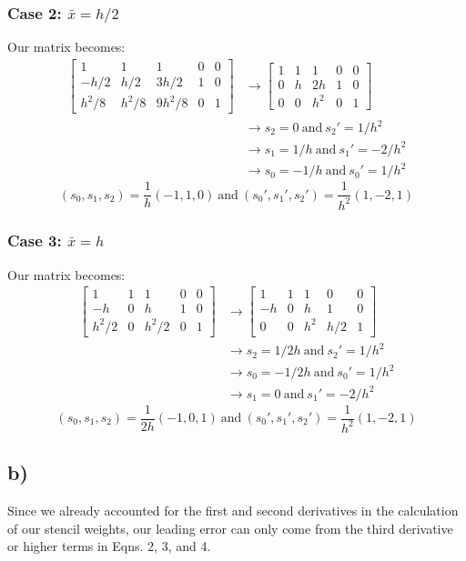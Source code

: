 \documentclass{article}
\newcommand{\andSp}{\ \mathrm{and}\ }
\begin{document}
\subsubsection*{Case 2: $\bar x=h/2$}
Our matrix becomes:
\begin{align*}
\begin{bmatrix}
1 & 1 & 1 & 0 & 0\\
-h/2 & h/2 & 3h/2 & 1 & 0\\
h^2/8 & h^2/8 & 9h^2/8 & 0 & 1
\end{bmatrix}
&\to\begin{bmatrix}
1 & 1 & 1 & 0 & 0\\
0 & h & 2h & 1 & 0\\
0 & 0 & h^2 & 0 & 1
\end{bmatrix} \\
&\to s_2=0\andSp s_2'=1/h^2 \\
&\to s_1=1/h\andSp s_1'=-2/h^2 \\
&\to s_0=-1/h\andSp s_0'=1/h^2
\end{align*}
\begin{equation}
\boxed{(s_0,s_1,s_2)=\frac{1}{h}(-1,1,0)\andSp(s_0',s_1',s_2')=\frac{1}{h^2}(1,-2,1)}
\end{equation}
\subsubsection*{Case 3: $\bar x=h$}
Our matrix becomes:
\begin{align*}
\begin{bmatrix}
1 & 1 & 1 & 0 & 0\\
-h & 0 & h & 1 & 0\\
h^2/2 & 0 & h^2/2 & 0 & 1
\end{bmatrix}
&\to
\begin{bmatrix}
1 & 1 & 1 & 0 & 0\\
-h & 0 & h & 1 & 0\\
0 & 0 & h^2 & h/2 & 1
\end{bmatrix} \\
&\to s_2=1/2h\andSp s_2'=1/h^2 \\
&\to s_0=-1/2h\andSp s_0'=1/h^2 \\
&\to s_1=0\andSp s_1'=-2/h^2
\end{align*}
\begin{equation}
\boxed{(s_0,s_1,s_2)=\frac{1}{2h}(-1,0,1)\andSp(s_0',s_1',s_2')=\frac{1}{h^2}(1,-2,1)}
\end{equation}

\subsection*{b)}
Since we already accounted for the first and second derivatives in the calculation of our stencil weights, our leading error can only come from the third derivative or higher terms in Eqns. 2, 3, and 4.
\end{document}

